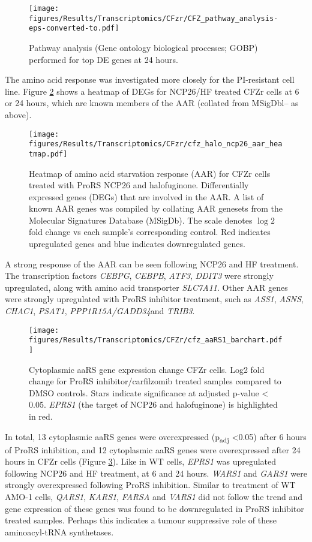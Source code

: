 \begin{figure}[htb]
\centering
\texttt{[image: figures/Results/Transcriptomics/CFzr/CFZ\_pathway\_analysis-eps-converted-to.pdf]}
\caption[Pathway enrichment analysis- CFZr cells]{Pathway analysis (Gene ontology biological processes; GOBP) performed for top DE genes at 24 hours.
}
\label{fig:cfz_pathway}
\end{figure}
%
The amino acid response was investigated more closely for the PI-resistant cell line.
Figure \ref{fig:cfz_aar_heatmap} shows a heatmap of DEGs for NCP26/HF treated CFZr cells at 6 or 24 hours, which are known members of the AAR (collated from MSigDbl-- as above).

\begin{figure}[p]
\centering
\texttt{[image: figures/Results/Transcriptomics/CFzr/cfz\_halo\_ncp26\_aar\_heatmap.pdf]}
\caption[Amino acid starvation response genes heatmap- CFZr cells]{Heatmap of amino acid starvation response (AAR) for CFZr cells treated with ProRS NCP26 and halofuginone.
Differentially expressed genes (DEGs) that are involved in the AAR.
A list of known AAR genes was compiled by collating AAR genesets from the Molecular Signatures Database (MSigDb).
The scale denotes $\log{2}$ fold change vs each sample's corresponding control.
Red indicates upregulated genes and blue indicates downregulated genes.
}
\label{fig:cfz_aar_heatmap}
\end{figure}
A strong response of the AAR can be seen following NCP26 and HF treatment.
The transcription factors \textit{CEBPG}, \textit{CEBPB}, \textit{ATF3}, \textit{DDIT3} were strongly upregulated, along with amino acid transporter \textit{SLC7A11}.
Other AAR genes were strongly upregulated with ProRS inhibitor treatment, such as \textit{ASS1}, \textit{ASNS}, \textit{CHAC1}, \textit{PSAT1}, \textit{PPP1R15A/GADD34}and \textit{TRIB3}.

\begin{figure}[htb]
\centering
\texttt{[image: figures/Results/Transcriptomics/CFZr/cfz\_aaRS1\_barchart.pdf]}
\caption[Cytoplasmic aaRS gene expression change- CFZr cells]{Cytoplasmic aaRS gene expression change CFZr cells.
Log2 fold change for ProRS inhibitor/carfilzomib treated samples compared to DMSO controls.
Stars indicate significance at adjusted p-value < 0.05.
\textit{EPRS1} (the target of NCP26 and halofuginone) is highlighted in red.
}
\label{fig:cfz_ARS1}
\end{figure}
In total, 13 cytoplasmic aaRS genes were overexpressed (p\textsubscript{adj} <0.05) after 6 hours of ProRS inhibition, and 12 cytoplasmic aaRS genes were overexpressed after 24 hours in CFZr cells (Figure \ref{fig:cfz_ARS1}).
Like in WT cells, \textit{EPRS1} was upregulated following NCP26 and HF treatment, at 6 and 24 hours.
\textit{WARS1} and \textit{GARS1} were strongly overexpressed following ProRS inhibition.
Similar to treatment of WT AMO-1 cells, \textit{QARS1}, \textit{KARS1}, \textit{FARSA} and \textit{VARS1} did not follow the trend and gene expression of these genes was found to be downregulated in ProRS inhibitor treated samples.
Perhaps this indicates a tumour suppressive role of these aminoacyl-tRNA synthetases.

